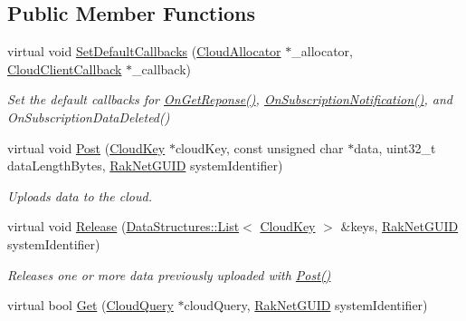 \subsection*{Public Member Functions}
\begin{DoxyCompactItemize}
\item 
virtual void \hyperlink{class_rak_net_1_1_cloud_client_a27fd20daa3c333eeaca61ac07a43836a}{Set\-Default\-Callbacks} (\hyperlink{class_rak_net_1_1_cloud_allocator}{Cloud\-Allocator} $\ast$\-\_\-allocator, \hyperlink{class_rak_net_1_1_cloud_client_callback}{Cloud\-Client\-Callback} $\ast$\-\_\-callback)
\begin{DoxyCompactList}\small\item\em Set the default callbacks for \hyperlink{class_rak_net_1_1_cloud_client_a2142bcf4cd9484ee3c3e897d5fde5e55}{On\-Get\-Reponse()}, \hyperlink{class_rak_net_1_1_cloud_client_aefd840feec9d674e2066dd491d61fa62}{On\-Subscription\-Notification()}, and On\-Subscription\-Data\-Deleted() \end{DoxyCompactList}\item 
virtual void \hyperlink{class_rak_net_1_1_cloud_client_aa561b024fd2f02c7f19c1cc36cfd2382}{Post} (\hyperlink{struct_rak_net_1_1_cloud_key}{Cloud\-Key} $\ast$cloud\-Key, const unsigned char $\ast$data, uint32\-\_\-t data\-Length\-Bytes, \hyperlink{struct_rak_net_1_1_rak_net_g_u_i_d}{Rak\-Net\-G\-U\-I\-D} system\-Identifier)
\begin{DoxyCompactList}\small\item\em Uploads data to the cloud. \end{DoxyCompactList}\item 
virtual void \hyperlink{class_rak_net_1_1_cloud_client_aae48fdc1ca602cf8d5ac590a66e7cdf1}{Release} (\hyperlink{class_data_structures_1_1_list}{Data\-Structures\-::\-List}$<$ \hyperlink{struct_rak_net_1_1_cloud_key}{Cloud\-Key} $>$ \&keys, \hyperlink{struct_rak_net_1_1_rak_net_g_u_i_d}{Rak\-Net\-G\-U\-I\-D} system\-Identifier)
\begin{DoxyCompactList}\small\item\em Releases one or more data previously uploaded with \hyperlink{class_rak_net_1_1_cloud_client_aa561b024fd2f02c7f19c1cc36cfd2382}{Post()} \end{DoxyCompactList}\item 
virtual bool \hyperlink{class_rak_net_1_1_cloud_client_a97bcdfb7e824f979efa7491d3c837204}{Get} (\hyperlink{struct_rak_net_1_1_cloud_query}{Cloud\-Query} $\ast$cloud\-Query, \hyperlink{struct_rak_net_1_1_rak_net_g_u_i_d}{Rak\-Net\-G\-U\-I\-D} system\-Identifier)

\end{DoxyCompactItemize}
